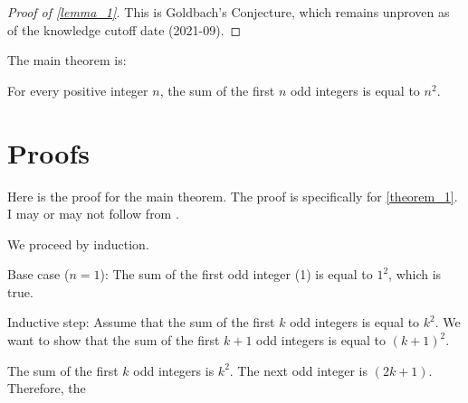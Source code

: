 \documentclass{article}
\begin{document}
\begin{proof}[Proof of \autoref{lemma_1}]
  \label{proof:lemma_1}
  This is Goldbach's Conjecture, which remains unproven as of the knowledge cutoff date (2021-09).

\end{proof}

The main theorem is:

\begin{theorem}
  \label{theorem_1}
  For every positive integer $n$, the sum of the first $n$ odd integers is equal to $n^2$.

\end{theorem}

\section{Proofs}
\label{proofs}
Here is the proof for the main theorem. The proof is specifically for \autoref{theorem_1}. I may or may not follow from \cite{rudelsonSparseReconstructionFourier2008}.

We proceed by induction.

Base case ($n = 1$): The sum of the first odd integer (1) is equal to $1^2$, which is true.

Inductive step: Assume that the sum of the first $k$ odd integers is equal to $k^2$. We want to show that the sum of the first $k+1$ odd integers is equal to $(k+1)^2$.

The sum of the first $k$ odd integers is $k^2$. The next odd integer is $(2k+1)$. Therefore, the

\printbibliography
\end{document}
